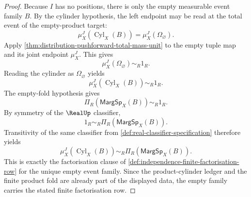 \begin{proof}
Because $I$ has no positions, there is only the empty measurable event family $B$. By the cylinder hypothesis, the left endpoint may be read at the total event of the empty-product target:
$$
\mu_X^J(\operatorname{Cyl}_X(B))=\mu_X^J(\Omega_{\varnothing}).
$$
Apply \autoref{thm:distribution-pushforward-total-mass-unit} to the empty tuple map and its joint endpoint $\mu_X^J$. This gives
$$
\mu_X^J(\Omega_{\varnothing})\sim_R1_R.
$$
Reading the cylinder as $\Omega_{\varnothing}$ yields
$$
\mu_X^J(\operatorname{Cyl}_X(B))\sim_R1_R.
$$
The empty-fold hypothesis gives
$$
\Pi_R(\mathsf{MargSp}_X(B))\sim_R1_R.
$$
By symmetry of the $\RealUp$ classifier,
$$
1_R\sim_R\Pi_R(\mathsf{MargSp}_X(B)).
$$
Transitivity of the same classifier from \autoref{def:real-classifier-specification} therefore yields
$$
\mu_X^J(\operatorname{Cyl}_X(B))\sim_R\Pi_R(\mathsf{MargSp}_X(B)).
$$
This is exactly the factorisation clause of \autoref{def:independence-finite-factorisation-row} for the unique empty event family. Since the product-cylinder ledger and the finite product fold are already part of the displayed data, the empty family carries the stated finite factorisation row.
\end{proof}

